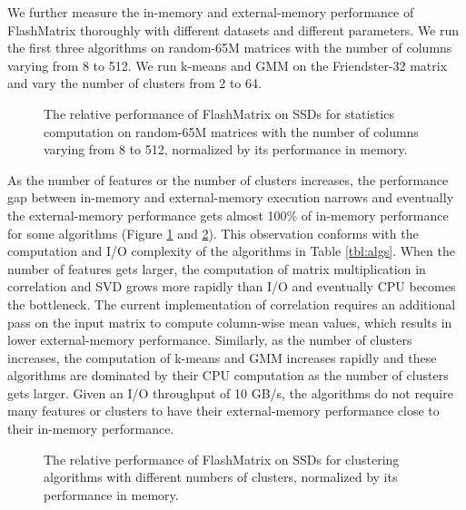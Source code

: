 We further measure the in-memory and external-memory performance of FlashMatrix
thoroughly with different datasets and different parameters. We run the first
three algorithms on random-65M matrices
with the number of columns varying from 8 to 512. We run k-means
and GMM on the Friendster-32 matrix and vary the number of clusters from 2 to 64.

\begin{figure}
	\begin{center}
		\footnotesize
		\vspace{-15pt}
		
		\vspace{-10pt}
		\caption{The relative performance of FlashMatrix on SSDs for
			statistics computation on random-65M matrices with the number of
			columns varying from 8 to 512, normalized by its performance
		in memory.}
		\label{perf:stat}
	\end{center}
\end{figure}

As the number of features or the number of clusters increases,
the performance gap between in-memory and external-memory execution
narrows and eventually the external-memory performance gets almost 100\%
of in-memory performance for some algorithms (Figure \ref{perf:stat} and
\ref{perf:clust}).
This observation conforms with the computation and I/O complexity of
the algorithms in Table \ref{tbl:algs}. When the number of features
gets larger, the computation of matrix multiplication in
correlation and SVD grows more rapidly than I/O and eventually CPU becomes
the bottleneck. The current implementation of correlation requires an additional
pass on the input matrix to compute column-wise mean values, which results in
lower external-memory performance. Similarly, as the number of clusters
increases, the computation of k-means and GMM increases rapidly and
these algorithms are dominated by their CPU computation as the number
of clusters gets larger. Given an I/O throughput of 10 GB/s, the algorithms
do not require many features or clusters to have their external-memory
performance close to their in-memory performance.

\begin{figure}
	\begin{center}
		\footnotesize
		\vspace{-15pt}
		
		\vspace{-10pt}
		\caption{The relative performance of FlashMatrix on SSDs for
			clustering algorithms with different numbers of clusters, normalized
		by its performance in memory.}
		\label{perf:clust}
	\end{center}
\end{figure}

